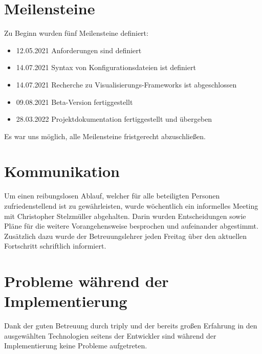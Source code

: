\section{Meilensteine}
Zu Beginn wurden fünf Meilensteine definiert:

\begin{itemize}
    \item 12.05.2021 Anforderungen sind definiert
    \item 14.07.2021 Syntax von Konfigurationsdateien ist definiert
    \item 14.07.2021 Recherche zu Visualisierungs-Frameworks ist abgeschlossen
    \item 09.08.2021 Beta-Version fertiggestellt
    \item 28.03.2022 Projektdokumentation fertiggestellt und übergeben
\end{itemize}

Es war uns möglich, alle Meilensteine fristgerecht abzuschließen.

\section{Kommunikation}
Um einen reibungslosen Ablauf, welcher für alle beteiligten Personen zufriedenstellend ist zu gewährleisten, wurde wöchentlich
ein informelles Meeting mit Christopher Stelzmüller abgehalten.
Darin wurden Entscheidungen sowie Pläne für die weitere Vorangehensweise besprochen und aufeinander abgestimmt.
Zusätzlich dazu wurde der Betreuungslehrer jeden Freitag über den aktuellen Fortschritt schriftlich informiert.

\section{Probleme während der Implementierung}
Dank der guten Betreuung durch triply und der bereits großen Erfahrung in den ausgewählten Technologien seitens der
Entwickler sind während der Implementierung keine Probleme aufgetreten.
